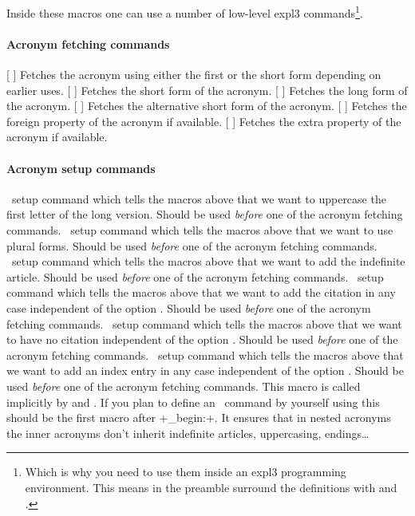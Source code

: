 \documentclass{acro-manual}
\begin{document}
Inside these macros one can use a number of low-level expl3
commands\footnote{Which is why you need to use them inside an expl3
  programming environment.  This means in the preamble surround the
  definitions with  and .}.

\paragraph{Acronym fetching commands}
\begin{commands}
  [ ]
    Fetches the acronym using either the first or the short form depending on
    earlier uses.
  [ ]
    Fetches the short form of the acronym.
  [ ]
    Fetches the long form of the acronym.
  [ ]
    Fetches the alternative short form of the acronym.
  [ ]
    Fetches the foreign property of the acronym if available.
  [ ]
    Fetches the extra property of the acronym if available.
\end{commands}

\paragraph{Acronym setup commands}
\begin{commands}
    \acro\ setup command which tells the macros above that we want to
    uppercase the first letter of the long version.  Should be used
    \emph{before} one of the acronym fetching commands.
    \acro\ setup command which tells the macros above that we want to use
    plural forms. Should be used \emph{before} one of the acronym fetching
    commands.
    \acro\ setup command which tells the macros above that we want to add the
    indefinite article.  Should be used \emph{before} one of the acronym
    fetching commands.
    \acro\ setup command which tells the macros above that we want to add the
    citation in any case independent of the option .  Should be
    used \emph{before} one of the acronym fetching commands.
    \acro\ setup command which tells the macros above that we want to have no
    citation independent of the option .  Should be used
    \emph{before} one of the acronym fetching commands.
    \acro\ setup command which tells the macros above that we want to add an
    index entry in any case independent of the option .  Should
    be used \emph{before} one of the acronym fetching commands.
    This macro is called implicitly by 
    and .  If you plan to define an \acro\ command by
    yourself using  this should be the first macro
    after \verbcode+\acro_begin:+.  It ensures that in nested acronyms the
    inner acronyms don't inherit indefinite articles, uppercasing,
    endings\ldots
\end{commands}
\end{document}
